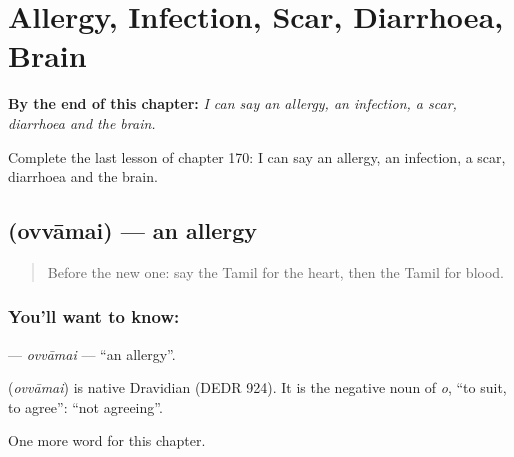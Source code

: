 
\chapter{Allergy, Infection, Scar, Diarrhoea, Brain}
\label{ch:ta-allergy-infection-scar-diarrhoea-brain}

\begin{chapteropening}
\textbf{By the end of this chapter:} \emph{I can say an allergy, an infection, a scar, diarrhoea and the brain.}

Complete the last lesson of chapter 170: I can say an allergy, an infection, a scar, diarrhoea and the brain.
\end{chapteropening}

\section[\texorpdfstring{\ta{ஒவ்வாமை} (ovvāmai)}{ஒவ்வாமை (ovvāmai)}]{ (ovvāmai) — an allergy}

\label{lesson:TA-C170-ovvamai}



\begin{quote}
Before the new one: say the Tamil for the heart, then the Tamil for blood.
\end{quote}

\subsection*{You'll want to know: }
\textbf{} — \emph{ovvāmai} — \textquotedblleft{}an allergy\textquotedblright{}.

\begin{cousinweb}
\textbf{} (\emph{ovvāmai}) is native Dravidian (DEDR 924). It is the negative noun of \emph{o}, \textquotedblleft{}to suit, to agree\textquotedblright{}: \textquotedblleft{}not agreeing\textquotedblright{}.
\end{cousinweb}

\begin{grammarlens}[title={What you've built}]
One more word for this chapter.
\end{grammarlens}

